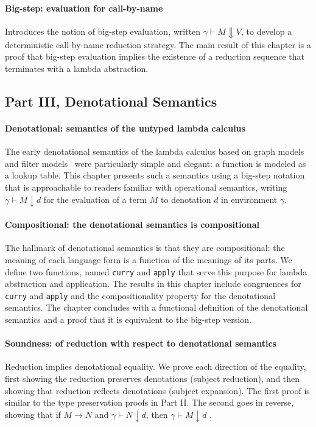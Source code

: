 \documentclass[preprint,authoryear]{elsarticle}
\begin{document}
\paragraph{Big-step: evaluation for call-by-name}
Introduces the notion of big-step evaluation, written $\gamma \vdash M
\Downarrow V$, to develop a deterministic call-by-name reduction
strategy. The main result of this chapter is a proof that big-step
evaluation implies the existence of a reduction sequence that
terminates with a lambda abstraction.

\subsection*{Part III, Denotational Semantics}

\paragraph{Denotational: semantics of the untyped lambda calculus}
The early denotational semantics of the lambda calculus based on graph
models~\citep{Scott-1976,Engeler-1981,Plotkin-1993} and filter
models~\citep{Barendregt-1983} were particularly simple and elegant: a
function is modeled as a lookup table.  This chapter presents such a
semantics using a big-step notation that is approachable to readers
familiar with operational semantics, writing $\gamma \vdash M
\downarrow d$ for the evaluation of a term $M$ to denotation $d$ in
environment $\gamma$.

\paragraph{Compositional: the denotational semantics is compositional}
The hallmark of denotational semantics is that they are compositional:
the meaning of each language form is a function of the meanings of its
parts.
%
We define two functions, named \texttt{curry} and \texttt{apply} that
serve this purpose for lambda abstraction and application.
%
The results in this chapter include congruences for \texttt{curry} and
\texttt{apply} and the compositionality property for the denotational
semantics.
%
The chapter concludes with a functional definition of the denotational
semantics and a proof that it is equivalent to the big-step version.

\paragraph{Soundness: of reduction with respect to denotational semantics}
Reduction implies denotational equality. We prove each direction of
the equality, first showing the reduction preserves denotations
(subject reduction), and then showing that reduction reflects
denotations (subject expansion). The first proof is similar to the
type preservation proofs in Part II. The second goes in reverse,
showing that if $M \longrightarrow N$ and $\gamma \vdash N
\downarrow d$, then $\gamma \vdash M \downarrow d$ .
\end{document}

